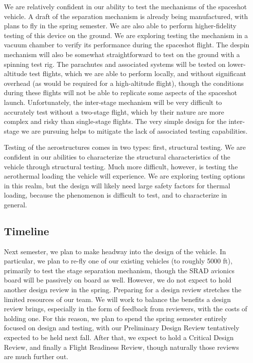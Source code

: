 We are relatively confident in our ability to test the mechanisms of the spaceshot vehicle. A draft of the separation mechanism is already being manufactured, with plans to fly in the spring semester. We are also able to perform higher-fidelity testing of this device on the ground. We are exploring testing the mechanism in a vacuum chamber to verify its performance during the spaceshot flight. The despin mechanism will also be somewhat straightforward to test on the ground with a spinning test rig. The parachutes and associated systems will be tested on lower-altitude test flights, which we are able to perform locally, and without significant overhead (as would be required for a high-altitude flight), though the conditions during these flights will not be able to replicate some aspects of the spaceshot launch. Unfortunately, the inter-stage mechanism will be very difficult to accurately test without a two-stage flight, which by their nature are more complex and risky than single-stage flights. The very simple design for the inter-stage we are pursuing helps to mitigate the lack of associated testing capabilities.

Testing of the aerostructures comes in two types: first, structural testing. We are confident in our abilities to characterize the structural characteristics of the vehicle through structural testing. Much more difficult, however, is testing the aerothermal loading the vehicle will experience. We are exploring testing options in this realm, but the design will likely need large safety factors for thermal loading, because the phenomenon is difficult to test, and to characterize in general.

\subsection{Timeline}
Next semester, we plan to make headway into the design of the vehicle. In particular, we plan to re-fly one of our existing vehicles (to roughly 5000 ft), primarily to test the stage separation mechanism, though the SRAD avionics board will be passively on board as well. However, we do not expect to hold another design review in the spring. Preparing for a design review stretches the limited resources of our team. We will work to balance the benefits a design review brings, especially in the form of feedback from reviewers, with the costs of holding one. For this reason, we plan to spend the spring semester entirely focused on design and testing, with our Preliminary Design Review tentatively expected to be held next fall. After that, we expect to hold a Critical Design Review, and finally a Flight Readiness Review, though naturally those reviews are much further out.
